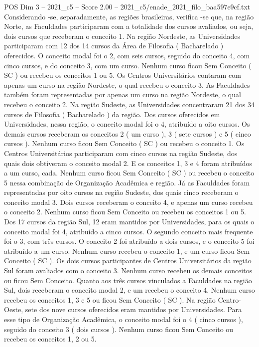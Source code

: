 \begin{textsample}{POS Dim 3 – 2021\_c5 – Score 2.00 – 2021\_c5/enade\_2021\_filo\_baa597e9cf.txt}
Considerando -se, separadamente, as regiões brasileiras, verifica -se que, na região Norte, as Faculdades participaram com a totalidade dos cursos avaliados, ou seja, dois cursos que receberam o conceito 1.
Na região Nordeste, as Universidades participaram com 12 dos 14 cursos da Área de Filosofia ( Bacharelado ) oferecidos.
O conceito modal foi o 2, com seis cursos, seguido do conceito 4, com cinco cursos, e do conceito 3, com um curso.
Nenhum curso ficou Sem Conceito ( SC ) ou recebeu os conceitos 1 ou 5.
Os Centros Universitários contaram com apenas um curso na região Nordeste, o qual recebeu o conceito 3.
As Faculdades também foram representadas por apenas um curso na região Nordeste, o qual recebeu o conceito 2.
Na região Sudeste, as Universidades concentraram 21 dos 34 cursos de Filosofia ( Bacharelado ) da região.
Dos cursos oferecidos em Universidades, nessa região, o conceito modal foi o 4, atribuído a oito cursos.
Os demais cursos receberam os conceitos 2 ( um curso ), 3 ( sete cursos ) e 5 ( cinco cursos ).
Nenhum curso ficou Sem Conceito ( SC ) ou recebeu o conceito 1.
Os Centros Universitários participaram com cinco cursos na região Sudeste, dos quais dois obtiveram o conceito modal 2.
E os conceitos 1, 3 e 4 foram atribuídos a um curso, cada.
Nenhum curso ficou Sem Conceito ( SC ) ou recebeu o conceito 5 nessa combinação de Organização Acadêmica e região.
Já as Faculdades foram representadas por oito cursos na região Sudeste, dos quais cinco receberam o conceito modal 3.
Dois cursos receberam o conceito 4, e apenas um curso recebeu o conceito 2.
Nenhum curso ficou Sem Conceito ou recebeu os conceitos 1 ou 5.
Dos 17 cursos da região Sul, 12 eram mantidos por Universidades, para os quais o conceito modal foi 4, atribuído a cinco cursos.
O segundo conceito mais frequente foi o 3, com três cursos.
O conceito 2 foi atribuído a dois cursos, e o conceito 5 foi atribuído a um curso.
Nenhum curso recebeu o conceito 1, e um curso ficou Sem Conceito ( SC ).
Os dois cursos participantes de Centros Universitários da região Sul foram avaliados com o conceito 3.
Nenhum curso recebeu os demais conceitos ou ficou Sem Conceito.
Quanto aos três cursos vinculados a Faculdades na região Sul, dois receberam o conceito modal 2, e um recebeu o conceito 4.
Nenhum curso recebeu os conceitos 1, 3 e 5 ou ficou Sem Conceito ( SC ).
Na região Centro-Oeste, sete dos nove cursos oferecidos eram mantidos por Universidades.
Para esse tipo de Organização Acadêmica, o conceito modal foi o 4 ( cinco cursos ), seguido do conceito 3 ( dois cursos ).
Nenhum curso ficou Sem Conceito ou recebeu os conceitos 1, 2 ou 5.

\end{textsample}
